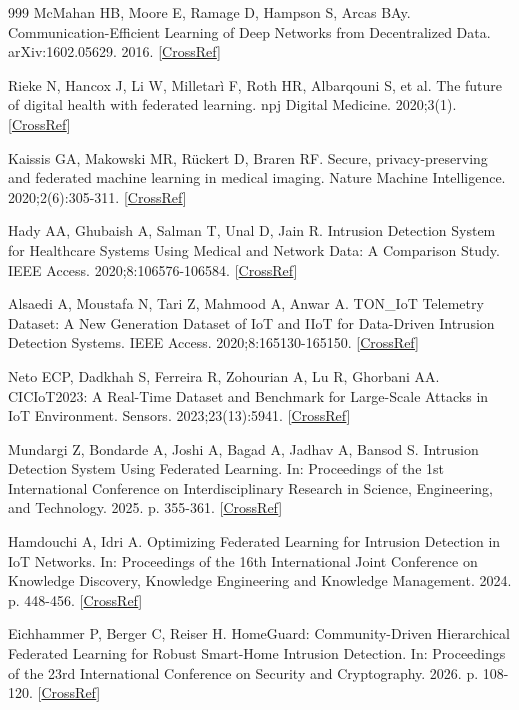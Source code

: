 \documentclass[cmc,article,submit,moreauthors,pdftex]{Definitions/tsp}
\begin{document}
\begin{thebibliography}{999}
McMahan HB, Moore E, Ramage D, Hampson S, Arcas BAy. Communication-Efficient Learning of Deep Networks from Decentralized Data. arXiv:1602.05629. 2016. [\href{https://doi.org/10.48550/arXiv.1602.05629}{CrossRef}]

Rieke N, Hancox J, Li W, Milletarì F, Roth HR, Albarqouni S, et al. The future of digital health with federated learning. npj Digital Medicine. 2020;3(1). [\href{https://doi.org/10.1038/s41746-020-00323-1}{CrossRef}]

Kaissis GA, Makowski MR, Rückert D, Braren RF. Secure, privacy-preserving and federated machine learning in medical imaging. Nature Machine Intelligence. 2020;2(6):305-311. [\href{https://doi.org/10.1038/s42256-020-0186-1}{CrossRef}]

Hady AA, Ghubaish A, Salman T, Unal D, Jain R. Intrusion Detection System for Healthcare Systems Using Medical and Network Data: A Comparison Study. IEEE Access. 2020;8:106576-106584. [\href{https://doi.org/10.1109/access.2020.3000421}{CrossRef}]

Alsaedi A, Moustafa N, Tari Z, Mahmood A, Anwar A. TON\_IoT Telemetry Dataset: A New Generation Dataset of IoT and IIoT for Data-Driven Intrusion Detection Systems. IEEE Access. 2020;8:165130-165150. [\href{https://doi.org/10.1109/access.2020.3022862}{CrossRef}]

Neto ECP, Dadkhah S, Ferreira R, Zohourian A, Lu R, Ghorbani AA. CICIoT2023: A Real-Time Dataset and Benchmark for Large-Scale Attacks in IoT Environment. Sensors. 2023;23(13):5941. [\href{https://doi.org/10.3390/s23135941}{CrossRef}]

Mundargi Z, Bondarde A, Joshi A, Bagad A, Jadhav A, Bansod S. Intrusion Detection System Using Federated Learning. In: Proceedings of the 1st International Conference on Interdisciplinary Research in Science, Engineering, and Technology. 2025. p. 355-361. [\href{https://doi.org/10.5220/0014531600005061}{CrossRef}]

Hamdouchi A, Idri A. Optimizing Federated Learning for Intrusion Detection in IoT Networks. In: Proceedings of the 16th International Joint Conference on Knowledge Discovery, Knowledge Engineering and Knowledge Management. 2024. p. 448-456. [\href{https://doi.org/10.5220/0013040000003838}{CrossRef}]

Eichhammer P, Berger C, Reiser H. HomeGuard: Community-Driven Hierarchical Federated Learning for Robust Smart-Home Intrusion Detection. In: Proceedings of the 23rd International Conference on Security and Cryptography. 2026. p. 108-120. [\href{https://doi.org/10.5220/0015063200004103}{CrossRef}]


\end{thebibliography}
\end{document}
